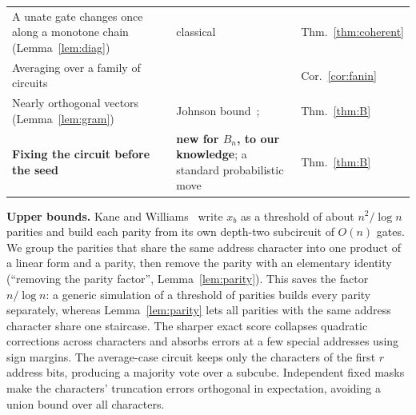 \documentclass[11pt,letterpaper]{article}
\theoremstyle{remark}
\newcommand{\smalltitle}[1]{\textbf{\color{ink}#1}\quad}
\begin{document}
\begin{center}
\begin{tabular}{@{}P{0.39\textwidth}P{0.33\textwidth}P{0.2\textwidth}@{}}
A unate gate changes once along a monotone chain (Lemma~\ref{lem:diag}) & classical~\cite[Lemma~2.1]{IPS} & Thm.~\ref{thm:coherent}\\
Averaging over a family of circuits & \cite[Cor.~1.1]{KW} & Cor.~\ref{cor:fanin}\\
Nearly orthogonal vectors (Lemma~\ref{lem:gram}) & Johnson bound~\cite{Gur}; \cite[Lemma~6.1]{KW} & Thm.~\ref{thm:B}\\
\textbf{Fixing the circuit before the seed} & \textbf{new for $B_n$, to our knowledge}; a standard probabilistic move & Thm.~\ref{thm:B}\\
\bottomrule
\end{tabular}
\end{center}

\smalltitle{Upper bounds.}
Kane and Williams~\cite[Thm.~1.2]{KW} write $x_b$ as a threshold of about
$n^2/\log n$ parities and build each parity from its own depth-two
subcircuit of $O(n)$ gates. We group the parities that share the same
address character into one product of a linear form and a parity, then
remove the parity with an elementary identity (``removing the parity
factor'', Lemma~\ref{lem:parity}). This saves the factor $n/\log n$: a
generic simulation of a threshold of parities builds every parity separately,
whereas Lemma~\ref{lem:parity} lets all parities with the same address
character share one staircase. The sharper exact score collapses quadratic
corrections across characters and absorbs errors at a few special addresses
using sign margins. The average-case circuit keeps only the characters of
the first $r$ address bits, producing a majority vote over a subcube.
Independent fixed masks make the characters' truncation errors orthogonal
in expectation, avoiding a union bound over all characters.
\end{document}
